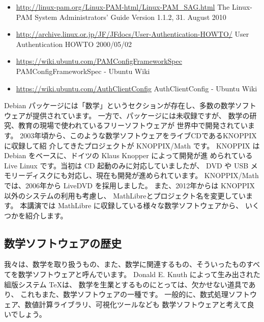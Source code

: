 \documentclass[mingoth,a4paper]{jsarticle}
\begin{document}
\begin{itemize}
\item \href{http://linux-pam.org/Linux-PAM-html/Linux-PAM_SAG.html}{http://linux-pam.org/Linux-PAM-html/Linux-PAM\_SAG.html} The Linux-PAM System Administrators' Guide Version 1.1.2, 31. August 2010
\item \href{http://archive.linux.or.jp/JF/JFdocs/User-Authentication-HOWTO/}{http://archive.linux.or.jp/JF/JFdocs/User-Authentication-HOWTO/} User Authentication HOWTO 2000/05/02
\item \href{https://wiki.ubuntu.com/PAMConfigFrameworkSpec}{https://wiki.ubuntu.com/PAMConfigFrameworkSpec} PAMConfigFrameworkSpec - Ubuntu Wiki
\item \href{https://wiki.ubuntu.com/AuthClientConfig}{https://wiki.ubuntu.com/AuthClientConfig} AuthClientConfig - Ubuntu Wiki
\end{itemize}


\label{sec:MathLibre}

\vspace{2em}

Debian パッケージには「数学」というセクションが存在し、多数の数学ソフト
ウェアが提供されています。 一方で、パッケージには未収録ですが、
数学の研究、教育の現場で使われているフリーソフトウェアが
世界中で開発されています。
2003年頃から、このような数学ソフトウェアをライブCDであるKNOPPIX に収録して紹
介してきたプロジェクトが KNOPPIX/Math です。
KNOPPIX は Debian をベースに、ドイツの Klaus Knopper によって開発が進
められている Live Linux です。当初は CD 起動のみに対応していましたが、
DVD や USB メモリーディスクにも対応し、現在も開発が進められています。
KNOPPIX/Math では、2006年から LiveDVD を採用しました。
また、2012年からは KNOPPIX 以外のシステムの利用も考慮し、
MathLibreとプロジェクト名を変更しています。
本講演では MathLibre に収録している様々な数学ソフトウェアから、
いくつかを紹介します。

\subsection{数学ソフトウェアの歴史}
我々は、数学を取り扱うもの、また、数学に関連するもの、そういったものすべ
てを数学ソフトウェアと呼んでいます。
Donald E. Knuth によって生み出された組版システム \TeX{}は、
数学を生業とするものにとっては、欠かせない道具であり、
これもまた、数学ソフトウェアの一種です。
一般的に、数式処理ソフトウェア、数値計算ライブラリ、可視化ツールなども
数学ソフトウェアと考えて良いでしょう。
\end{document}
